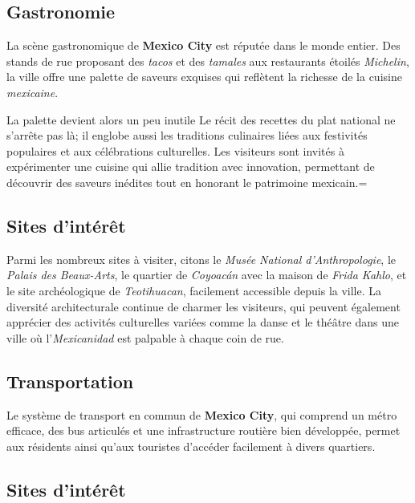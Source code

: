 \documentclass[12pt, a4paper]{article}
\begin{document}
\subsection*{\textbf{Gastronomie}}

La scène gastronomique de \textbf{Mexico City} est réputée dans le monde entier. Des stands de rue proposant des \textit{tacos} et des \textit{tamales} aux restaurants étoilés \textit{Michelin}, la ville offre une palette de saveurs exquises qui reflètent la richesse de la cuisine \textit{mexicaine}.

La palette devient alors un peu inutile
Le récit des recettes du plat national ne s'arrête pas là; il englobe aussi les traditions culinaires liées aux festivités populaires et aux célébrations culturelles. Les visiteurs sont invités à expérimenter une cuisine qui allie tradition avec innovation, permettant de découvrir des saveurs inédites tout en honorant le patrimoine mexicain.=
\subsection*{\textbf{Sites d'intérêt}}

Parmi les nombreux sites à visiter, citons le \textit{Musée National d'Anthropologie}, le \textit{Palais des Beaux-Arts}, le quartier de \textit{Coyoacán} avec la maison de \textit{Frida Kahlo}, et le site archéologique de \textit{Teotihuacan}, facilement accessible depuis la ville.
La diversité architecturale continue de charmer les visiteurs, qui peuvent également apprécier des activités culturelles variées comme la danse et le théâtre dans une ville où l'\textit{Mexicanidad} est palpable à chaque coin de rue. \subsection*{\textbf{Transportation}} Le système de transport en commun de \textbf{Mexico City}, qui comprend un métro efficace, des bus articulés et une infrastructure routière bien développée, permet aux résidents ainsi qu'aux touristes d'accéder facilement à divers quartiers.

\subsection*{\textbf{Sites d'intérêt}}
\end{document}
